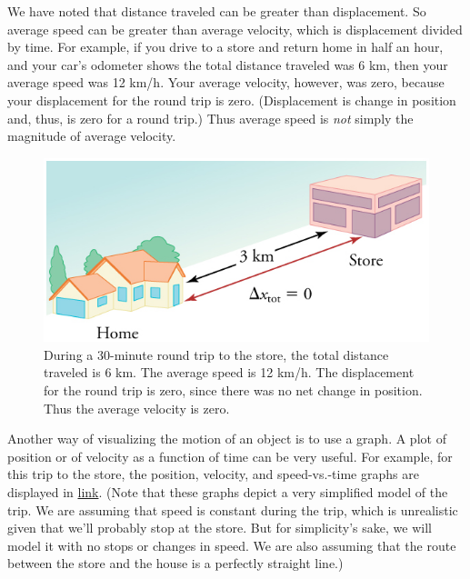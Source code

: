 \documentclass[
]{book}
\begin{document}
We have noted that distance traveled can be greater than displacement.
So average speed can be greater than average velocity, which is
displacement divided by time. For example, if you drive to a store and
return home in half an hour, and your car's odometer shows the total
distance traveled was 6 km, then your average speed was 12 km/h. Your
average velocity, however, was zero, because your displacement for the
round trip is zero. (Displacement is change in position and, thus, is
zero for a round trip.) Thus average speed is \emph{not} simply the magnitude
of average velocity.

\begin{figure}
\hypertarget{import-auto-id2593426}{%
\centering
\includegraphics{images/Figure_02_02_02.jpg}
\caption{During a 30-minute round trip to the store, the total distance
traveled is 6 km. The average speed is 12 km/h. The displacement for the
round trip is zero, since there was no net change in position. Thus the
average velocity is
zero.}\label{import-auto-id2593426}
}
\end{figure}

Another way of visualizing the motion of an object is to use a graph. A
plot of position or of velocity as a function of time can be very
useful. For example, for this trip to the store, the position, velocity,
and speed-vs.-time graphs are displayed in
\protect\hyperlink{import-auto-id1806646}{link}. (Note that these
graphs depict a very simplified \protect\hypertarget{import-auto-id1510828}{}{model} of the trip. We are assuming that speed is constant
during the trip, which is unrealistic given that we'll probably stop at
the store. But for simplicity's sake, we will model it with no stops or
changes in speed. We are also assuming that the route between the store
and the house is a perfectly straight line.)
\end{document}

